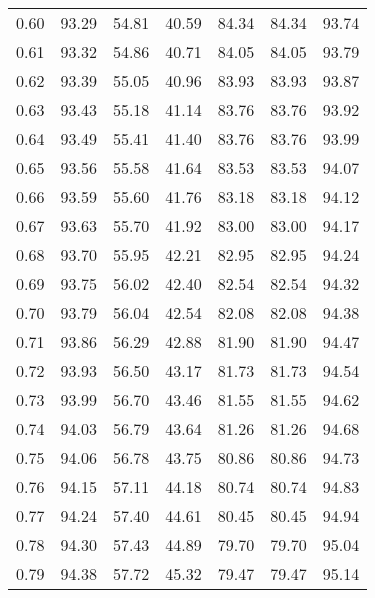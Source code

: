\begin{tabular}{|c|c|c|c|c|c|c|}
      0.60 &     93.29 &     54.81 &      40.59 &   84.34 &      84.34 &         93.74 \\
      0.61 &     93.32 &     54.86 &      40.71 &   84.05 &      84.05 &         93.79 \\
      0.62 &     93.39 &     55.05 &      40.96 &   83.93 &      83.93 &         93.87 \\
      0.63 &     93.43 &     55.18 &      41.14 &   83.76 &      83.76 &         93.92 \\
      0.64 &     93.49 &     55.41 &      41.40 &   83.76 &      83.76 &         93.99 \\
      0.65 &     93.56 &     55.58 &      41.64 &   83.53 &      83.53 &         94.07 \\
      0.66 &     93.59 &     55.60 &      41.76 &   83.18 &      83.18 &         94.12 \\
      0.67 &     93.63 &     55.70 &      41.92 &   83.00 &      83.00 &         94.17 \\
      0.68 &     93.70 &     55.95 &      42.21 &   82.95 &      82.95 &         94.24 \\
      0.69 &     93.75 &     56.02 &      42.40 &   82.54 &      82.54 &         94.32 \\
      0.70 &     93.79 &     56.04 &      42.54 &   82.08 &      82.08 &         94.38 \\
      0.71 &     93.86 &     56.29 &      42.88 &   81.90 &      81.90 &         94.47 \\
      0.72 &     93.93 &     56.50 &      43.17 &   81.73 &      81.73 &         94.54 \\
      0.73 &     93.99 &     56.70 &      43.46 &   81.55 &      81.55 &         94.62 \\
      0.74 &     94.03 &     56.79 &      43.64 &   81.26 &      81.26 &         94.68 \\
      0.75 &     94.06 &     56.78 &      43.75 &   80.86 &      80.86 &         94.73 \\
      0.76 &     94.15 &     57.11 &      44.18 &   80.74 &      80.74 &         94.83 \\
      0.77 &     94.24 &     57.40 &      44.61 &   80.45 &      80.45 &         94.94 \\
      0.78 &     94.30 &     57.43 &      44.89 &   79.70 &      79.70 &         95.04 \\
      0.79 &     94.38 &     57.72 &      45.32 &   79.47 &      79.47 &         95.14 \\

\end{tabular}
